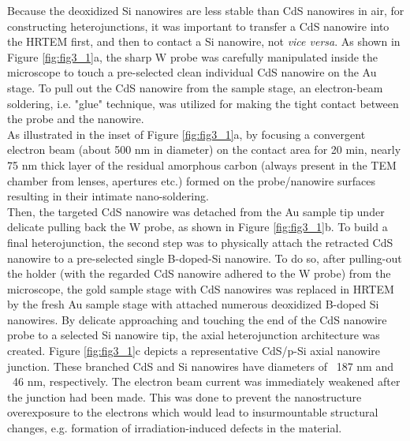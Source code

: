 Because the deoxidized Si nanowires are less stable than CdS nanowires in air, for constructing heterojunctions, it was important to transfer a CdS nanowire into the HRTEM first, and then to contact a Si nanowire, not \textit{vice versa}. As shown in Figure \ref{fig:fig3_1}a, the sharp W probe was carefully manipulated inside the microscope to touch a pre-selected clean individual CdS nanowire on the Au stage. To pull out the CdS nanowire from the sample stage, an electron-beam soldering, i.e. "glue" technique, was utilized for making the tight contact between the probe and the nanowire. \\

As illustrated in the inset of Figure \ref{fig:fig3_1}a, by focusing a convergent electron beam (about 500 nm in diameter) on the contact area for 20 min, nearly 75 nm thick layer of the residual amorphous carbon (always present in the TEM chamber from lenses, apertures etc.) formed on the probe/nanowire surfaces  resulting in their intimate nano-soldering. \\

Then, the targeted CdS nanowire was detached from the Au sample tip under delicate pulling back the W probe, as shown in Figure \ref{fig:fig3_1}b. To build a final heterojunction, the second step was to physically attach the retracted CdS nanowire to a pre-selected single B-doped-Si nanowire. To do so, after pulling-out the holder (with the regarded CdS nanowire adhered to the W probe) from the microscope, the gold sample stage with CdS nanowires was replaced in HRTEM by the fresh Au sample stage with attached numerous deoxidized B-doped Si nanowires. By delicate approaching and touching the end of the CdS nanowire probe to a selected Si nanowire tip, the axial heterojunction architecture was created. Figure \ref{fig:fig3_1}c depicts a representative CdS/p-Si axial nanowire junction. These branched CdS and Si nanowires have diameters of ~187 nm and ~46 nm, respectively. The electron beam current was immediately weakened after the junction had been made. This was done to prevent the nanostructure overexposure to the electrons which would lead to insurmountable structural changes, e.g. formation of irradiation-induced defects in the material.


